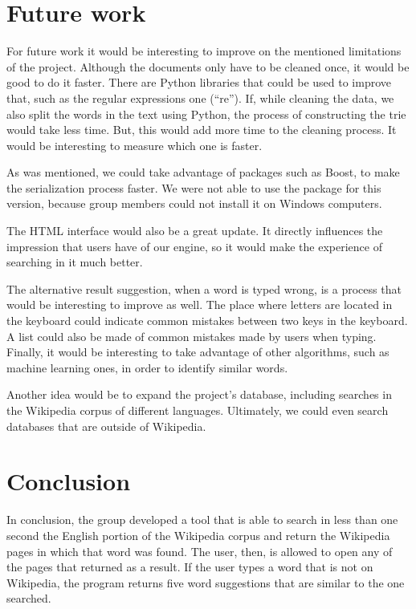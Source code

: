\documentclass{article}
\begin{document}
\section*{Future work}
For future work it would be interesting to improve on the mentioned limitations of the project. Although the documents only have to be cleaned once, it would be good to do it faster. There are Python libraries that could be used to improve that, such as the regular expressions one (``re''). If, while cleaning the data, we also split the words in the text using Python, the process of constructing the trie would take less time. But, this would add more time to the cleaning process. It would be interesting to measure which one is faster.

As was mentioned, we could take advantage of packages such as Boost, to make the serialization process faster. We were not able to use the package for this version, because group members could not install it on Windows computers. 

The HTML interface would also be a great update. It directly influences the impression that users have of our engine, so it would make the experience of searching in it much better. 

The alternative result suggestion, when a word is typed wrong, is a process that would be interesting to improve as well. The place where letters are located in the keyboard could indicate common mistakes between two keys in the keyboard. A list could also be made of common mistakes made by users when typing. Finally, it would be interesting to take advantage of other algorithms, such as machine learning ones, in order to identify similar words. 

Another idea would be to expand the project's database, including searches in the Wikipedia corpus of different languages. Ultimately, we could even search databases that are outside of Wikipedia. 

\section*{Conclusion}
In conclusion, the group developed a tool that is able to search in less than one second the English portion of the Wikipedia corpus and return the Wikipedia pages in which that word was found. The user, then, is allowed to open any of the pages that returned as a result. If the user types a word that is not on Wikipedia, the program returns five word suggestions that are similar to the one searched. 
\end{document}
